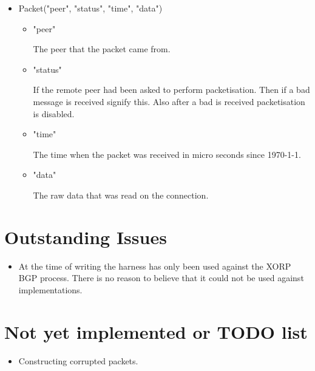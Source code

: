 \documentclass[11pt]{article}
\begin{document}
\begin{itemize}
\item Packet("peer", "status", "time", "data")

  \begin{itemize}
        \item "peer"
          
          The peer that the packet came from.

        \item "status" 
          
          If the remote peer had been asked to perform packetisation.
          Then if a bad message is received signify this. Also after a
          bad is received packetisation is disabled.

        \item "time"
          
          The time when the packet was received in micro seconds since
          \mbox{1970-1-1}.

        \item "data"
          
          The raw data that was read on the connection.

      \end{itemize}
\end{itemize}

\section{Outstanding Issues}

\begin{itemize}
\item At the time of writing the harness has only been used against
  the XORP BGP process. There is no reason to believe that it could
  not be used against implementations.
\end{itemize}

\section{\label{NYI} Not yet implemented or TODO list}

\begin{itemize}
\item Constructing corrupted packets.
\end{itemize}



\end{document}
